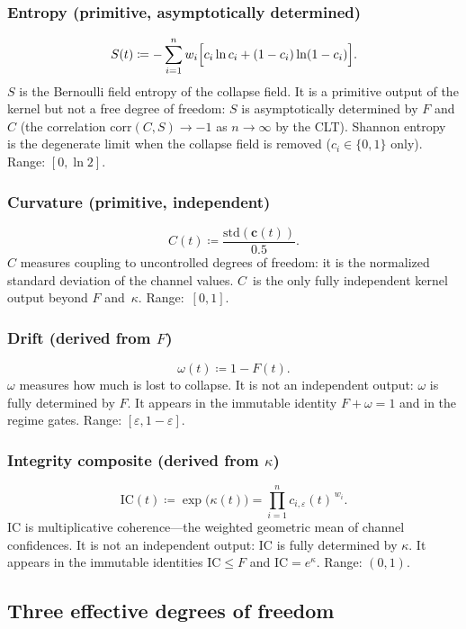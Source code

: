 \documentclass[
  aps,
  prd,
  twocolumn,
  superscriptaddress,
  nofootinbib,
  floatfix
]{revtex4-2}
\newcommand{\eps}{\varepsilon}
\newcommand{\beq}{\begin{equation}}
\newcommand{\eeq}{\end{equation}}
\newcommand{\tvec}{\mathbf{c}}
\newcommand{\IC}{\mathrm{IC}}
\begin{document}
\subsubsection{Entropy (primitive, asymptotically determined)}
\beq
  S(t) \coloneqq -\sum_{i=1}^n w_i\Bigl[
    c_i \ln c_i + (1-c_i) \ln(1-c_i)
  \Bigr].
  \label{eq:S}
\eeq
$S$ is the Bernoulli field entropy of the collapse field.  It is
a primitive output of the kernel but not a free degree of freedom:
$S$ is asymptotically determined by $F$ and $C$ (the correlation
$\mathrm{corr}(C,S) \to -1$ as $n \to \infty$ by the CLT).
Shannon entropy~\cite{shannon1948} is the degenerate limit when
the collapse field is removed ($c_i \in \{0,1\}$ only).  Range:
$[0, \ln 2]$.

\subsubsection{Curvature (primitive, independent)}
\beq
  C(t) \coloneqq \frac{\mathrm{std}(\tvec(t))}{0.5}.
  \label{eq:C}
\eeq
$C$ measures coupling to uncontrolled degrees of freedom: it is
the normalized standard deviation of the channel values.
$C$~is the only fully independent kernel output beyond $F$
and~$\kappa$.  Range:~$[0, 1]$.

\subsubsection{Drift (derived from $F$)}
\beq
  \omega(t) \coloneqq 1 - F(t).
  \label{eq:omega}
\eeq
$\omega$ measures how much is lost to collapse.  It is not an
independent output: $\omega$ is fully determined by $F$.  It
appears in the immutable identity $F + \omega = 1$ and in the
regime gates.  Range: $[\eps, 1-\eps]$.

\subsubsection{Integrity composite (derived from $\kappa$)}
\beq
  \IC(t) \coloneqq \exp\!\bigl(\kappa(t)\bigr)
  = \prod_{i=1}^n c_{i,\eps}(t)^{\,w_i}.
  \label{eq:IC}
\eeq
$\IC$ is multiplicative coherence---the weighted geometric mean
of channel confidences.  It is not an independent output: $\IC$
is fully determined by $\kappa$.  It appears in the immutable
identities $\IC \leq F$ and $\IC = e^\kappa$.
Range: $(0, 1)$.

\subsection{Three effective degrees of freedom}
\end{document}
